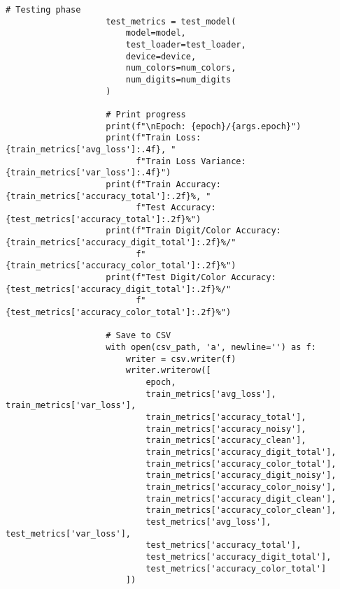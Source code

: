 \begin{lstlisting}[style=pythonstyle, caption={メインコード}]
                    # Testing phase
                    test_metrics = test_model(
                        model=model,
                        test_loader=test_loader,
                        device=device,
                        num_colors=num_colors,
                        num_digits=num_digits
                    )
    
                    # Print progress
                    print(f"\nEpoch: {epoch}/{args.epoch}")
                    print(f"Train Loss: {train_metrics['avg_loss']:.4f}, "
                          f"Train Loss Variance: {train_metrics['var_loss']:.4f}")
                    print(f"Train Accuracy: {train_metrics['accuracy_total']:.2f}%, "
                          f"Test Accuracy: {test_metrics['accuracy_total']:.2f}%")
                    print(f"Train Digit/Color Accuracy: {train_metrics['accuracy_digit_total']:.2f}%/"
                          f"{train_metrics['accuracy_color_total']:.2f}%")
                    print(f"Test Digit/Color Accuracy: {test_metrics['accuracy_digit_total']:.2f}%/"
                          f"{test_metrics['accuracy_color_total']:.2f}%")
    
                    # Save to CSV
                    with open(csv_path, 'a', newline='') as f:
                        writer = csv.writer(f)
                        writer.writerow([
                            epoch,
                            train_metrics['avg_loss'], train_metrics['var_loss'],
                            train_metrics['accuracy_total'],
                            train_metrics['accuracy_noisy'],
                            train_metrics['accuracy_clean'],
                            train_metrics['accuracy_digit_total'],
                            train_metrics['accuracy_color_total'],
                            train_metrics['accuracy_digit_noisy'],
                            train_metrics['accuracy_color_noisy'],
                            train_metrics['accuracy_digit_clean'],
                            train_metrics['accuracy_color_clean'],
                            test_metrics['avg_loss'], test_metrics['var_loss'],
                            test_metrics['accuracy_total'],
                            test_metrics['accuracy_digit_total'],
                            test_metrics['accuracy_color_total']
                        ])
    

\end{lstlisting}
